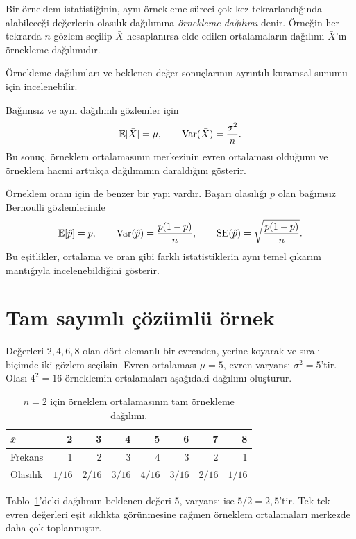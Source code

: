 \begin{definitionbox}
Bir örneklem istatistiğinin, aynı örnekleme süreci çok kez tekrarlandığında
alabileceği değerlerin olasılık dağılımına \emph{örnekleme dağılımı} denir.
Örneğin her tekrarda $n$ gözlem seçilip $\bar X$ hesaplanırsa elde edilen
ortalamaların dağılımı $\bar X$'ın örnekleme dağılımıdır.
\end{definitionbox}
Örnekleme
dağılımları ve beklenen değer sonuçlarının ayrıntılı kuramsal sunumu için
\citet{hogg2015} incelenebilir.

Bağımsız ve aynı dağılımlı gözlemler için
\[
\mathbb{E}[\bar X]=\mu,
\qquad
\operatorname{Var}(\bar X)=\frac{\sigma^2}{n}.
\]
Bu sonuç, örneklem ortalamasının merkezinin evren ortalaması olduğunu ve
örneklem hacmi arttıkça dağılımının daraldığını gösterir.

Örneklem oranı için de benzer bir yapı vardır. Başarı olasılığı $p$ olan
bağımsız Bernoulli gözlemlerinde
\[
\mathbb{E}[\hat p]=p,
\qquad
\operatorname{Var}(\hat p)=\frac{p(1-p)}{n},
\qquad
\operatorname{SE}(\hat p)=\sqrt{\frac{p(1-p)}{n}}.
\]
Bu eşitlikler, ortalama ve oran gibi farklı istatistiklerin aynı temel
çıkarım mantığıyla incelenebildiğini gösterir.

\section{Tam sayımlı çözümlü örnek}

Değerleri $2,4,6,8$ olan dört elemanlı bir evrenden, yerine koyarak ve sıralı
biçimde iki gözlem seçilsin. Evren ortalaması $\mu=5$, evren varyansı
$\sigma^2=5$'tir. Olası $4^2=16$ örneklemin ortalamaları aşağıdaki dağılımı
oluşturur.

\begin{table}[H]
\centering
\caption{$n=2$ için örneklem ortalamasının tam örnekleme dağılımı.}
\label{tab:exact-sampling-distribution}
\begin{tabular}{lrrrrrrr}
\toprule
$\bar x$ & 2 & 3 & 4 & 5 & 6 & 7 & 8 \\
\midrule
Frekans & 1 & 2 & 3 & 4 & 3 & 2 & 1 \\
Olasılık & $1/16$ & $2/16$ & $3/16$ & $4/16$ & $3/16$ & $2/16$ & $1/16$ \\
\bottomrule
\end{tabular}
\end{table}

Tablo~\ref{tab:exact-sampling-distribution}'deki dağılımın beklenen değeri 5,
varyansı ise $5/2=2{,}5$'tir. Tek tek evren
değerleri eşit sıklıkta görünmesine rağmen örneklem ortalamaları merkezde daha
çok toplanmıştır.

